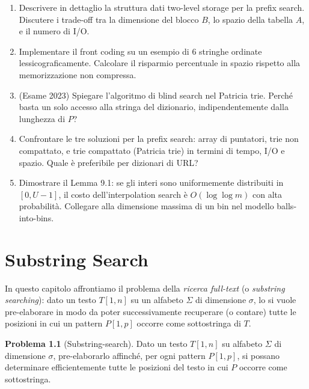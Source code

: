 \documentclass[12pt, a4paper, oneside]{book}
\theoremstyle{plain}
\theoremstyle{definition}
\newtheorem{problema}[teorema]{Problema}
\theoremstyle{remark}
\begin{document}
\begin{enumerate}
  \item Descrivere in dettaglio la struttura dati two-level storage per la prefix search. Discutere i trade-off tra la dimensione del blocco $B$, lo spazio della tabella $A$, e il numero di I/O.

  \item Implementare il front coding su un esempio di 6 stringhe ordinate lessicograficamente. Calcolare il risparmio percentuale in spazio rispetto alla memorizzazione non compressa.

  \item (Esame 2023) Spiegare l'algoritmo di blind search nel Patricia trie. Perché basta un solo accesso alla stringa del dizionario, indipendentemente dalla lunghezza di $P$?

  \item Confrontare le tre soluzioni per la prefix search: array di puntatori, trie non compattato, e trie compattato (Patricia trie) in termini di tempo, I/O e spazio. Quale è preferibile per dizionari di URL?

  \item Dimostrare il Lemma 9.1: se gli interi sono uniformemente distribuiti in $[0, U-1]$, il costo dell'interpolation search è $O(\log\log m)$ con alta probabilità. Collegare alla dimensione massima di un bin nel modello balls-into-bins.
\end{enumerate}

\chapter{Substring Search}
\label{ch:substring}

In questo capitolo affrontiamo il problema della \emph{ricerca full-text} (o \emph{substring searching}): dato un testo $T[1,n]$ su un alfabeto $\Sigma$ di dimensione $\sigma$, lo si vuole pre-elaborare in modo da poter successivamente recuperare (o contare) tutte le posizioni in cui un pattern $P[1,p]$ occorre come sottostringa di $T$.

\begin{problema}[Substring-search]
Dato un testo $T[1,n]$ su alfabeto $\Sigma$ di dimensione $\sigma$, pre-elaborarlo affinché, per ogni pattern $P[1,p]$, si possano determinare efficientemente tutte le posizioni del testo in cui $P$ occorre come sottostringa.
\end{problema}
\end{document}
